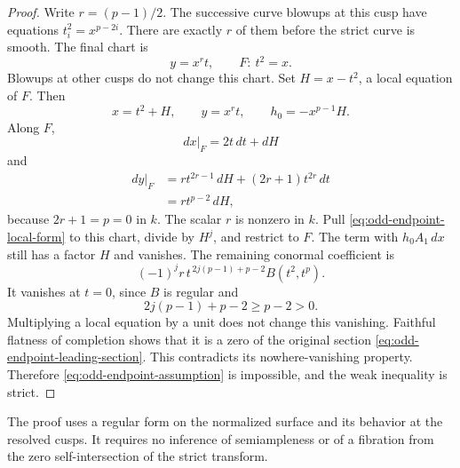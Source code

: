 \begin{proof}
Write $r=(p-1)/2$.
The successive curve blowups at this cusp have equations
$t_i^2=x^{p-2i}$.
There are exactly $r$ of them before the strict curve is smooth.
The final chart is
\[
 y=x^r t,\qquad F:\ t^2=x.
\]
Blowups at other cusps do not change this chart.
Set $H=x-t^2$, a local equation of $F$.
Then
\[
 x=t^2+H,\qquad y=x^r t,\qquad h_0=-x^{p-1}H.
\]
Along $F$,
\[
 dx|_F=2t\,dt+dH
\]
and
\begin{align*}
 dy|_F
 &=r t^{2r-1}\,dH+(2r+1)t^{2r}\,dt\\
 &=r t^{p-2}\,dH,
\end{align*}
because $2r+1=p=0$ in $k$.
The scalar $r$ is nonzero in $k$.
Pull \eqref{eq:odd-endpoint-local-form} to this chart, divide
by $H^j$, and restrict to $F$.
The term with $h_0A_1\,dx$ still has a factor $H$ and vanishes.
The remaining conormal coefficient is
\[
 (-1)^j r\,t^{\,2j(p-1)+p-2}B(t^2,t^p).
\]
It vanishes at $t=0$, since $B$ is regular and
\[
 2j(p-1)+p-2\geq p-2>0.
\]
Multiplying a local equation by a unit does not change
this vanishing.
Faithful flatness of completion shows that it is a zero
of the original section
\eqref{eq:odd-endpoint-leading-section}.
This contradicts its nowhere-vanishing property.
Therefore \eqref{eq:odd-endpoint-assumption} is impossible,
and the weak inequality is strict.
\end{proof}

The proof uses a regular form on the normalized surface and its
behavior at the resolved cusps.
It requires no inference of semiampleness or of a fibration
from the zero self-intersection of the strict transform.
